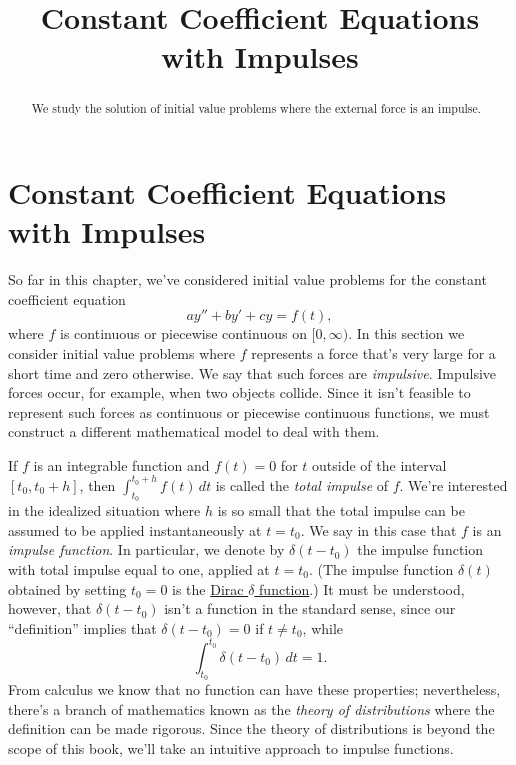 \documentclass{ximera}
\title{Constant Coefficient Equations with Impulses}%
\begin{document}
\begin{abstract}
We study the solution of initial value problems where the external force is an impulse.
\end{abstract}

\maketitle

\section*{Constant Coefficient Equations with Impulses}

So far in this chapter, we've considered initial value problems
for the constant coefficient equation
$$
ay''+by'+cy=f(t),
$$
where $f$ is continuous or piecewise continuous on $[0,\infty)$. In
this section we consider initial value problems where $f$
represents a force that's very large for a short time and
zero otherwise. We say that such forces are \textit{impulsive}.
Impulsive forces occur, for example, when two objects collide. Since
it isn't  feasible to represent such forces as continuous or
piecewise continuous functions, we must construct a different
mathematical model to deal with them.

If $f$ is an integrable function and $f(t)=0$ for $t$ outside of
the interval $[t_0,t_0+h]$, then $\int_{t_0}^{t_0+h} f(t)\,dt$ is
called the \textit{total impulse} of $f$. We're interested in the
idealized situation where $h$ is so small that the total impulse
can be assumed to be applied instantaneously at $t=t_0$. We say in
this case that $f$ is an \textit{impulse function}. In particular, we
denote by $\delta(t-t_0)$ the impulse function with total impulse
equal to one, applied at $t=t_0$. (The impulse function $\delta(t)$
obtained by setting $t_0=0$ is  the
\href{http://www-history.mcs.st-and.ac.uk/Mathematicians/Dirac.html}
{Dirac $\delta$ function\/}.) It must be understood, however, that
$\delta(t-t_0)$ isn't  a function in the standard sense, since our
``definition'' implies that $\delta(t-t_0)=0$ if $t\neq t_0$, while
$$
\int_{t_0}^{t_0} \delta(t-t_0)\,dt=1.
$$
From calculus we know that no function can have these properties;
nevertheless, there's a branch of mathematics known as the
\textit{theory of distributions} where  the  definition can be made
rigorous. Since the theory of distributions is beyond the
scope of this book, we'll take an intuitive approach to impulse
functions.
\end{document}
